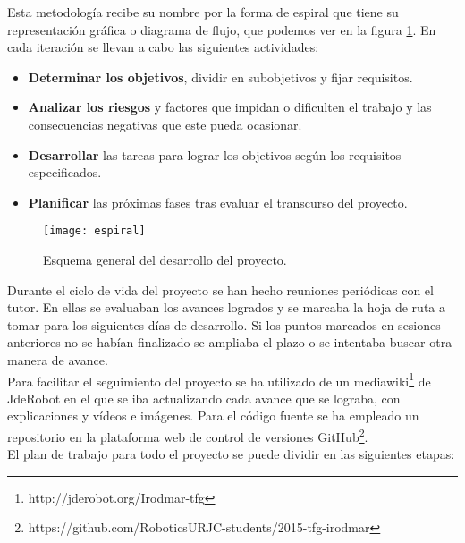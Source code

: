 Esta metodología recibe su nombre por la forma de espiral que tiene su representación gráfica o diagrama de flujo, que podemos ver en la figura \ref{fig:planificacion_espiral}. En cada iteración se llevan a cabo las siguientes actividades:

\begin{itemize}
 \item \textbf{Determinar los objetivos}, dividir en subobjetivos y fijar requisitos.
 \item \textbf{Analizar los riesgos} y factores que impidan o dificulten el trabajo y las consecuencias negativas que este
 pueda ocasionar.
 \item \textbf{Desarrollar} las tareas para lograr los objetivos según los requisitos especificados.
 \item \textbf{Planificar} las próximas fases tras evaluar el transcurso del proyecto.
\end{itemize}

\begin{figure}[htb]
\centering
\texttt{[image: espiral]}
\caption{Esquema general del desarrollo del proyecto.}
\label{fig:planificacion_espiral}
\end{figure}

Durante el ciclo de vida del proyecto se han hecho reuniones periódicas con el tutor. En ellas se evaluaban los avances logrados y se marcaba la hoja de ruta a tomar para los siguientes días de desarrollo. Si los puntos marcados en sesiones anteriores no se habían finalizado se ampliaba el plazo o se intentaba buscar otra manera de avance.\\

Para facilitar el seguimiento del proyecto se ha utilizado de un mediawiki\footnote{http://jderobot.org/Irodmar-tfg} de JdeRobot en el que se iba actualizando cada avance que se lograba, con explicaciones y vídeos e imágenes. Para el código fuente se ha empleado un repositorio en la plataforma web de control de versiones GitHub\footnote{https://github.com/RoboticsURJC-students/2015-tfg-irodmar}.\\

El plan de trabajo para todo el proyecto se puede dividir en las siguientes etapas:

